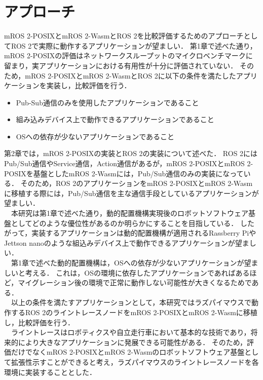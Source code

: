 \chapter{アプローチ}
\label{chap:aproach}
mROS 2-POSIXとmROS 2-WasmとROS 2を比較評価するためのアプローチとしてROS 2で実際に動作するアプリケーションが望ましい．
第1章で述べた通り，mROS 2-POSIXの評価はネットワークスループットのマイクロベンチマークに留まり，実アプリケーションにおける有用性が十分に評価されていない．
そのため，mROS 2-POSIXとmROS 2-WasmとROS 2に以下の条件を満たしたアプリケーションを実装し，比較評価を行う．
\begin{itemize}
    \item Pub-Sub通信のみを使用したアプリケーションであること
    \item 組み込みデバイス上で動作できるアプリケーションであること
    \item OSへの依存が少ないアプリケーションであること
\end{itemize}
第2章では，mROS 2-POSIXの実装とROS 2の実装について述べた．
ROS 2にはPub/Sub通信やService通信，Action通信があるが，mROS 2-POSIXとmROS 2-POSIXを基盤としたmROS 2-Wasmには，Pub/Sub通信のみの実装になっている．
そのため，ROS 2のアプリケーションをmROS 2-POSIXとmROS 2-Wasmに移植する際には，Pub/Sub通信を主な通信手段としているアプリケーションが望ましい．
\\　本研究は第1章で述べた通り，動的配置機構実現後のロボットソフトウェア基盤としてどのような優位性があるのか明らかにすることを目指している．
したがって，実装するアプリケーションは動的配置機構が適用されるRassberry PiやJettson nanoのような組込みデバイス上で動作できるアプリケーションが望ましい．
\\　第1章で述べた動的配置機構は，OSへの依存が少ないアプリケーションが望ましいと考える．
これは，OSの環境に依存したアプリケーションであればあるほど，マイグレーション後の環境で正常に動作しない可能性が大きくなるためである．
\\　以上の条件を満たすアプリケーションとして，本研究ではラズパイマウスで動作するROS 2のライントレースノードをmROS 2-POSIXとmROS 2-Wasmに移植し，比較評価を行う．
\\　ライントレースはロボティクスや自立走行車において基本的な技術であり，将来的により大きなアプリケーションに発展できる可能性がある．
そのため，評価だけでなくmROS 2-POSIXとmROS 2-Wasmのロボットソフトウェア基盤として拡張性示すことができると考え，ラズパイマウスのライントレースノードを各環境に実装することとした．

